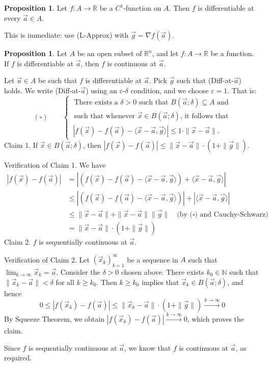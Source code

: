 \documentclass[11pt]{article}
\makeatletter
\theoremstyle{definition}
\newtheorem{prop}[thm]{Proposition}
\newcommand{\N}{\ensuremath{\mathbb{N}}}
\newcommand{\R}{\ensuremath{\mathbb{R}}}
\newenvironment{pf}[1][\proofname]{\par
  \pushQED{\qed}%
  \normalfont \topsep0\p@\relax
  \trivlist
  \item[\hskip\labelsep\itshape
  #1\@addpunct{.}]\ignorespaces
}{%
  \popQED\endtrivlist\@endpefalse
}
\makeatother
\begin{document}
\begin{prop}
Let $f : A \to \R$ be a $C^1$-function on $A$. Then $f$ is differentiable at every $\vec{a} \in A$. 
\begin{pf}
This is immediate: use (L-Approx) with $\vec{g} = \nabla f(\vec{a})$.
\end{pf}
\end{prop}

\begin{prop}
Let $A$ be an open subset of $\R^n$, and let $f : A \to \R$ be a function. If $f$ is differentiable at $\vec{a}$, then $f$ is continuous at $\vec{a}$.
\begin{pf}
Let $\vec{a} \in A$ be such that $f$ is differentiable at $\vec{a}$. Pick $\vec{g}$ such that (Diff-at-$\vec{a}$) holds. We write (Diff-at-$\vec{a}$) using an $\varepsilon$-$\delta$ condition, and we choose $\varepsilon = 1$. That is:
$$(\square) \qquad \begin{cases} \text{ There exists a $\delta > 0$ such that $B(\vec{a}; \delta) \subseteq A$ and} \\ \text{ such that whenever $\vec{x} \in B(\vec{a}; \delta)$, it follows that} \\ \, |f(\vec{x}) - f(\vec{a}) - \langle \vec{x} - \vec{a}, \vec{g} \rangle| \leq 1 \cdot \|\vec{x} - \vec{a}\|. \end{cases}$$
{\sc Claim 1.} If $\vec{x} \in B(\vec{a}; \delta)$, then $|f(\vec{x}) - f(\vec{a})| \leq \|\vec{x} - \vec{a}\| \cdot (1 + \|\vec{g}\|)$.

{\sc Verification of Claim 1.} We have
\begin{align*}
    |f(\vec{x}) - f(\vec{a})| &= |(f(\vec{x}) - f(\vec{a}) - \langle \vec{x} - \vec{a}, \vec{g} \rangle) + \langle \vec{x} - \vec{a}, \vec{g} \rangle| \\
    &\leq |(f(\vec{x}) - f(\vec{a}) - \langle \vec{x} - \vec{a}, \vec{g} \rangle)| + |\langle \vec{x} - \vec{a}, \vec{g} \rangle| \\
    &\leq \|\vec{x} - \vec{a}\| + \|\vec{x} - \vec{a}\| \|\vec{g}\| \quad \text{(by ($\square$) and Cauchy-Schwarz)} \\
    &= \|\vec{x} - \vec{a}\| \cdot (1 + \|\vec{g}\|)
\end{align*}
{\sc Claim 2.} $f$ is sequentially continuous at $\vec{a}$.

{\sc Verification of Claim 2.} Let $(\vec{x}_k)_{k=1}^\infty$ be a sequence in $A$ such that $\lim_{k\to\infty} \vec{x}_k = \vec{a}$. Consider the $\delta > 0$ chosen above. There exists $k_0 \in \N$ such that $\|\vec{x}_k - \vec{a}\| < \delta$ for all $k \geq k_0$. Then $k \geq k_0$ implies that $\vec{x}_k \in B(\vec{a}; \delta)$, and hence
$$0 \leq |f(\vec{x}_k) - f(\vec{a})| \leq \|\vec{x}_k - \vec{a}\| \cdot (1 + \|\vec{g}\|) \xrightarrow[]{k\to\infty} 0$$
By Squeeze Theorem, we obtain $|f(\vec{x}_k) - f(\vec{a})| \xrightarrow[]{k\to\infty} 0$, which proves the claim.

Since $f$ is sequentially continuous at $\vec{a}$, we know that $f$ is continuous at $\vec{a}$, as required.
\end{pf}
\end{prop}
\end{document}
